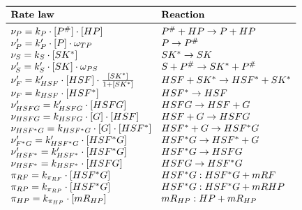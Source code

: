 \documentclass[oneside, 10pt, a4paper, twocolumn]{article}
\begin{document}
\bgroup
\def\arraystretch{1.5}%
\begin{table}[h!]
\[\begin{array}{ll}
\toprule
 \text{\textbf{Rate law}}                                                              & \text{\textbf{Reaction}}                 \\
\midrule
 \nu_P        = k_{P} \cdot [P^\#] \cdot [HP]                                 & P^\# + HP \rightarrow P + HP    \\
 \nu_P'       = k_{P}' \cdot [P] \cdot \omega_{TP}                            & P \rightarrow P^\#              \\
 \nu_S        = k_S \cdot [SK^*]                                              & SK^* \rightarrow SK             \\
 \nu_S'       = k_{S}' \cdot [SK] \cdot \omega_{PS}                            & S+P^\# \rightarrow SK^*+P^\#    \\
 \nu_F'       = k_{HSF}' \cdot [HSF] \cdot \frac{[SK^*]}{1+[SK^*]}            & HSF+SK^* \rightarrow HSF^*+SK^* \\
 \nu_F        = k_{HSF} \cdot [HSF^*]                                         & HSF^* \rightarrow HSF           \\    
 \nu_{HSFG}'  = k_{HSFG}' \cdot [HSFG]                                        & HSFG \rightarrow HSF + G        \\
 \nu_{HSFG}   = k_{HSFG} \cdot [G] \cdot [HSF]                                & HSF + G \rightarrow HSFG        \\ 
 \nu_{HSF^*G} = k_{HSF^*G} \cdot [G] \cdot [HSF^*]                            & HSF^* + G \rightarrow HSF^*G    \\ 
 \nu_{F^*G}'  = k_{HSF^*G}' \cdot [HSF^*G]                                    & HSF^*G \rightarrow HSF^* + G    \\
 \nu_{HSF^*}' = k_{HSF^*}' \cdot [HSF^*G]                                     & HSF^*G \rightarrow HSFG         \\
 \nu_{HSF^*}  = k_{HSF^*} \cdot [HSFG]                                        & HSFG \rightarrow HSF^*G         \\
 \pi_{RF}     = k_{\pi_{RF}} \cdot [HSF^*G]                                   & HSF^*G: HSF^*G + mRF            \\
 \pi_{RP}     = k_{\pi_{RP}} \cdot [HSF^*G]                                   & HSF^*G: HSF^*G + mRHP           \\
 \pi_{HP}     = k_{\pi_{HP}} \cdot [mR_{HP}]                                  & mR_{HP}: HP + mR_{HP}           \\

\end{array}\]
\end{table}
\end{document}
